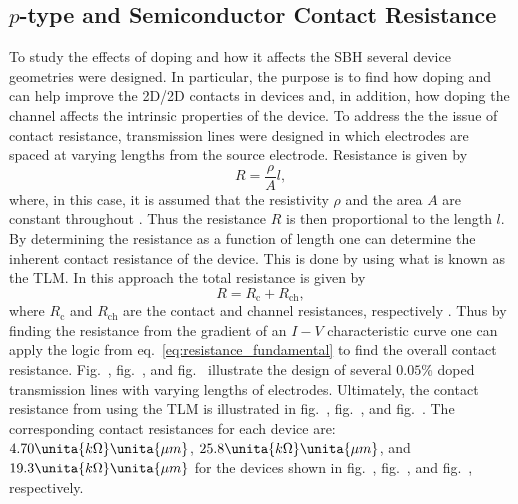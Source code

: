 \subsection{$p$-type  and  Semiconductor Contact Resistance}\label{subsec:mos2_doping_contact}
To study the effects of doping and how it affects the \ac{SBH} several  device geometries were designed. In particular, the purpose is to find how doping  and  can help improve the 2D/2D contacts in devices and, in addition, how doping the channel affects the intrinsic properties of the device. To address the the issue of contact resistance, transmission lines were designed in which electrodes are spaced at varying lengths from the source electrode. Resistance is given by 
\begin{equation}\label{eq:resistance_fundamental}
R = \frac{\rho}{A} l,
\end{equation}
where, in this case, it is assumed that the resistivity $\rho$ and the area $A$ are constant throughout \cite{Schroder_Semiconductor2006}. Thus the resistance $R$ is then proportional to the length $l$. By determining the resistance as a function of length one can determine the inherent contact resistance of the device. This is done by using what is known as the \ac{TLM}. In this approach the total resistance is given by
\begin{equation}\label{eq:resistance_tlm}
R = R_\mathrm{c} + R_\mathrm{ch},
\end{equation}
where $R_\mathrm{c}$ and $R_\mathrm{ch}$ are the contact and channel resistances, respectively \cite{Schroder_Semiconductor2006}. Thus by finding the resistance from the gradient of an $I-V$ characteristic curve one can apply the logic from eq.~\ref{eq:resistance_fundamental} to find the overall contact resistance. Fig.~, fig.~, and fig.~ illustrate the design of several $0.05\%$  doped  transmission lines with varying lengths of electrodes. Ultimately, the contact resistance from using the \ac{TLM} is illustrated in fig.~, fig.~, and fig.~. The corresponding contact resistances for each device are: $4.70\unita{k\Omega}\unita{\mu m}$, $25.8\unita{k\Omega}\unita{\mu m}$, and $19.3\unita{k\Omega}\unita{\mu m}$ for the devices shown in fig.~, fig.~, and fig.~, respectively.
